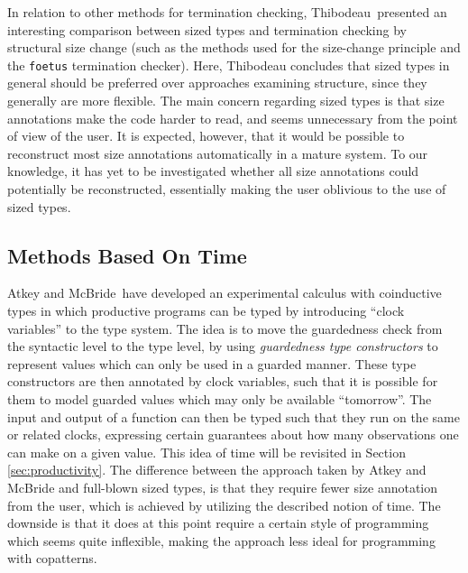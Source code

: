 In relation to other methods for termination checking, Thibodeau\,\citep{Thibodeau11} presented an interesting comparison between sized types and termination checking by structural size change (such as the methods used for the size-change principle and the \texttt{foetus} termination checker). Here, Thibodeau concludes that sized types in general should be preferred over approaches examining structure, since they generally are more flexible. The main concern regarding sized types is that size annotations make the code harder to read, and seems unnecessary from the point of view of the user. It is expected, however, that it would be possible to reconstruct most size annotations automatically in a mature system. To our knowledge, it has yet to be investigated whether all size annotations could potentially be reconstructed, essentially making the user oblivious to the use of sized types.

\subsection{Methods Based On Time}
Atkey and McBride\,\citep{AtkeyMcBride13} have developed an experimental calculus with coinductive types in which productive programs can be typed by introducing ``clock variables'' to the type system. The idea is to move the guardedness check from the syntactic level to the type level, by using \emph{guardedness type constructors} to represent values which can only be used in a guarded manner. These type constructors are then annotated by clock variables, such that it is possible for them to model guarded values which may only be available ``tomorrow''. The input and output of a function can then be typed such that they run on the same or related clocks, expressing certain guarantees about how many observations one can make on a given value. This idea of time will be revisited in Section \ref{sec:productivity}. The difference between the approach taken by Atkey and McBride and full-blown sized types, is that they require fewer size annotation from the user, which is achieved by utilizing the described notion of time. The downside is that it does at this point require a certain style of programming which seems quite inflexible, making the approach less ideal for programming with copatterns.

